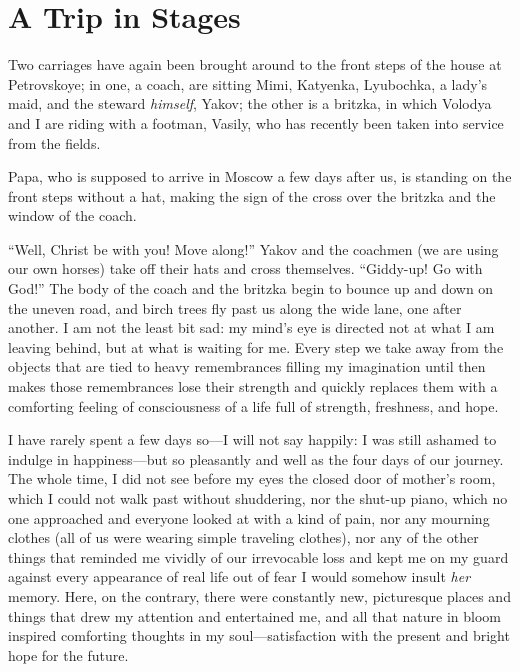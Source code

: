
\chapter{A Trip in Stages} %

Two carriages have again been brought around to the front steps of the house at Petrovskoye; in one, a coach, are sitting Mimi, Katyenka, Lyubochka, a lady's maid, and the steward \emph{himself}, Yakov; the other is a britzka, in which Volodya and I are riding with a footman, Vasily, who has recently been taken into service from the fields.

Papa, who is supposed to arrive in Moscow a few days after us, is standing on the front steps without a hat, making the sign of the cross over the britzka and the window of the coach.

``Well, Christ be with you! Move along!'' Yakov and the coachmen (we are using our own horses) take off their hats and cross themselves. ``Giddy-up! Go with God!'' The body of the coach and the britzka begin to bounce up and down on the uneven road, and birch trees fly past us along the wide lane, one after another. I am not the least bit sad: my mind's eye is directed not at what I am leaving behind, but at what is waiting for me. Every step we take away from the objects that are tied to heavy remembrances filling my imagination until then makes those remembrances lose their strength and quickly replaces them with a comforting feeling of consciousness of a life full of strength, freshness, and hope.

I have rarely spent a few days so---I will not say happily: I was still ashamed to indulge in happiness---but so pleasantly and well as the four days of our journey. The whole time, I did not see before my eyes the closed door of mother's room, which I could not walk past without shuddering, nor the shut-up piano, which no one approached and everyone looked at with a kind of pain, nor any mourning clothes (all of us were wearing simple traveling clothes), nor any of the other things that reminded me vividly of our irrevocable loss and kept me on my guard against every appearance of real life out of fear I would somehow insult \emph{her} memory. Here, on the contrary, there were constantly new, picturesque places and things that drew my attention and entertained me, and all that nature in bloom inspired comforting thoughts in my soul---satisfaction with the present and bright hope for the future.

